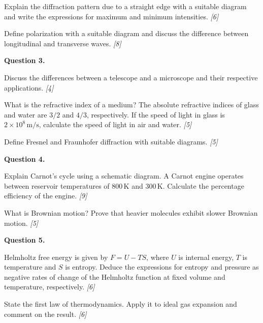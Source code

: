 \documentclass[11pt,a4paper]{article}
\newcommand{\pts}[1]{\hfill   \textit{[#1]}}
\begin{document}
\begin{parts}
  \item Explain the diffraction pattern due to a straight edge with a suitable diagram and write the expressions for maximum and minimum intensities. \pts{6}
  \item Define polarization with a suitable diagram and discuss the difference between longitudinal and transverse waves. \pts{8}
\end{parts}

\medskip


\noindent   \textbf{Question 3.}

\begin{parts}
  \item Discuss the differences between a telescope and a microscope and their respective applications. \pts{4}
  \item What is the refractive index of a medium? The absolute refractive indices of glass and water are $3/2$ and $4/3$, respectively. If the speed of light in glass is $2  \times 10^8\, \text{m/s}$, calculate the speed of light in air and water. \pts{5}
  \item Define Fresnel and Fraunhofer diffraction with suitable diagrams. \pts{5}
\end{parts}

\medskip


\noindent   \textbf{Question 4.}

\begin{parts}
  \item Explain Carnot's cycle using a schematic diagram. A Carnot engine operates between reservoir temperatures of $800\, \text{K}$ and $300\, \text{K}$. Calculate the percentage efficiency of the engine. \pts{9}
  \item What is Brownian motion? Prove that heavier molecules exhibit slower Brownian motion. \pts{5}
\end{parts}

\medskip


\noindent   \textbf{Question 5.}

\begin{parts}
  \item Helmholtz free energy is given by $F = U - TS$, where $U$ is internal energy, $T$ is temperature and $S$ is entropy. Deduce the expressions for entropy and pressure as negative rates of change of the Helmholtz function at fixed volume and temperature, respectively. \pts{6}
  \item State the first law of thermodynamics. Apply it to ideal gas expansion and comment on the result. \pts{6}
\end{parts}
\end{document}
